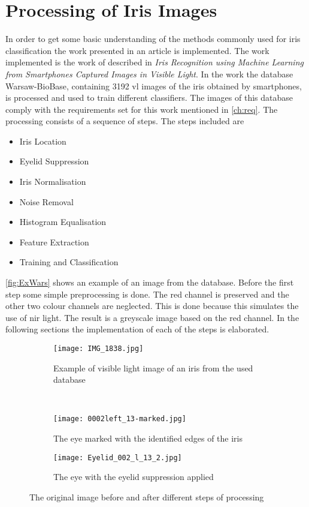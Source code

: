 \section{Processing of Iris Images}
\label{BasicM}
In order to get some basic understanding of the methods commonly used for iris classification the work presented in an article is implemented. The work implemented is the work of \cite{Khan2017a} described in \textit{Iris Recognition using Machine Learning from Smartphones Captured Images in Visible Light}. In the work the database Warsaw-BioBase, containing 3192 \gls{vl} images of the iris obtained by smartphones, is processed and used to train different classifiers. The images of this database comply with the requirements set for this work mentioned in \autoref{ch:req}. The processing consists of a sequence of steps. The steps included are

\begin{itemize}
\item Iris Location
\item Eyelid Suppression
\item Iris Normalisation
\item Noise Removal
\item Histogram Equalisation 
\item Feature Extraction
\item Training and Classification
\end{itemize}
\autoref{fig:ExWars} shows an example of an image from the database. Before the first step some simple preprocessing is done. The red channel is preserved and the other two colour channels are neglected. This is done because this simulates the use of \gls{nir} light. The result is a greyscale image based on the red channel. In the following sections the implementation of each of the steps is elaborated. 

\begin{figure}[h]
\centering
\begin{subfigure}{.47\textwidth}
\centering
\texttt{[image: IMG\_1838.jpg]}
\caption{Example of visible light image of an iris from the used database \citep{Trokielewicz2016}}
\label{fig:ExWars}
\end{subfigure}
~
\begin{subfigure}{.47\textwidth}
\centering
\texttt{[image: 0002left\_13-marked.jpg]}
\caption{The eye marked with the identified edges of the iris}
\label{fig:MarkedI}
\end{subfigure}

\begin{subfigure}{.47\textwidth}
\centering
\texttt{[image: Eyelid\_002\_l\_13\_2.jpg]}
\caption{The eye with the eyelid suppression applied}
\label{fig:IrisSup}
\end{subfigure}
\caption{The original image before and after different steps of processing}
\end{figure}



